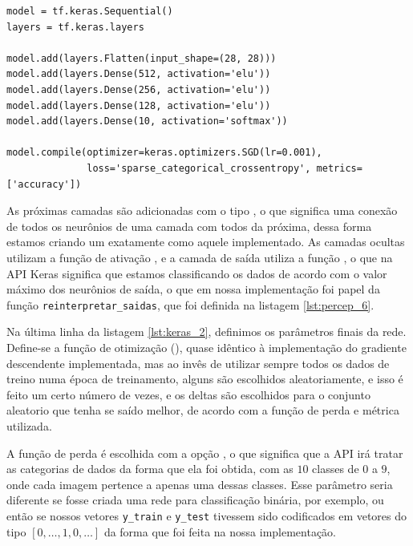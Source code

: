 \begin{scriptsize}
\estiloR
\begin{lstlisting}[caption={Trecho do script \eng{mnist\_keras.py}}, label={lst:keras_2}, escapeinside={\%}]
model = tf.keras.Sequential()
layers = tf.keras.layers

model.add(layers.Flatten(input_shape=(28, 28)))
model.add(layers.Dense(512, activation='elu'))
model.add(layers.Dense(256, activation='elu'))
model.add(layers.Dense(128, activation='elu'))
model.add(layers.Dense(10, activation='softmax'))

model.compile(optimizer=keras.optimizers.SGD(lr=0.001),
              loss='sparse_categorical_crossentropy', metrics=['accuracy'])
\end{lstlisting}
\end{scriptsize}

As próximas camadas são adicionadas com o tipo , o que significa uma conexão de todos os neurônios de uma camada com todos da próxima, dessa forma estamos criando um  exatamente como aquele implementado. As camadas ocultas utilizam a função de ativação , e a camada de saída utiliza a função , o que na API Keras significa que estamos classificando os dados de acordo com o valor máximo dos neurônios de saída, o que em nossa implementação foi papel da função \texttt{reinterpretar\_saidas}, que foi definida na listagem \ref{lst:percep_6}.

Na última linha da listagem \ref{lst:keras_2}, definimos os parâmetros finais da rede. Define-se a função de otimização  (), quase idêntico à implementação do gradiente descendente implementada, mas ao invês de utilizar sempre todos os dados de treino numa época de treinamento, alguns são escolhidos aleatoriamente, e isso é feito um certo número de vezes, e os deltas são escolhidos para o conjunto aleatorio que tenha se saído melhor, de acordo com a função de perda e métrica utilizada.

A função de perda é escolhida com a opção , o que significa que a API irá tratar as categorias de dados da forma que ela foi obtida, com as $10$ classes de $0$ a $9$, onde cada imagem pertence a apenas uma dessas classes. Esse parâmetro seria diferente se fosse criada uma rede para classificação binária, por exemplo, ou então se nossos vetores \texttt{y\_train} e \texttt{y\_test} tivessem sido codificados em vetores do tipo $[0,\ldots,1,0,\ldots]$ da forma que foi feita na nossa implementação.

